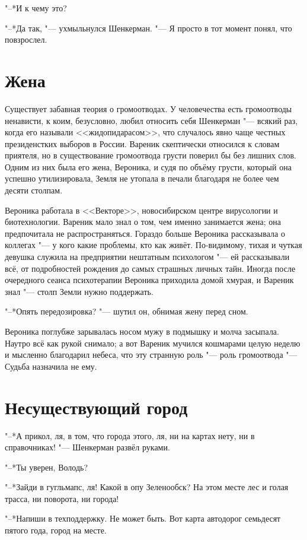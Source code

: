 "--*И к чему это?

"--*Да так, "--- ухмыльнулся Шенкерман.
"--- Я просто в тот момент понял, что повзрослел.

\section{Жена}

Существует забавная теория о громоотводах.
У человечества есть громоотводы ненависти, к коим, безусловно, любил относить себя Шенкерман "--- всякий раз, когда его называли <<жидопидарасом>>, что случалось явно чаще честных президенстких выборов в России.
Вареник скептически относился к словам приятеля, но в существование громоотвода грусти поверил бы без лишних слов.
Одним из них была его жена, Вероника, и судя по объёму грусти, который она успешно утилизировала, Земля не утопала в печали благодаря не более чем десяти столпам.

Вероника работала в <<Векторе>>, новосибирском центре вирусологии и биотехнологии.
Вареник мало знал о том, чем именно занимается жена;
она предпочитала не распространяться.
Гораздо больше Вероника рассказывала о коллегах "--- у кого какие проблемы, кто как живёт.
По-видимому, тихая и чуткая девушка служила на предприятии нештатным психологом "--- ей рассказывали всё, от подробностей рождения до самых страшных личных тайн.
Иногда после очередного сеанса психотерапии Вероника приходила домой хмурая, и Вареник знал "--- столп Земли нужно поддержать.

"--*Опять передозировка? "--- шутил он, обнимая жену перед сном.

Вероника поглубже зарывалась носом мужу в подмышку и молча засыпала.
Наутро всё как рукой снимало;
а вот Вареник мучился кошмарами целую неделю и мысленно благодарил небеса, что эту странную роль "--- роль громоотвода "--- Судьба назначила не ему.

\section{Несуществующий город}

"--*А прикол, ля, в том, что города этого, ля, ни на картах нету, ни в справочниках! "--- Шенкерман развёл руками.

"--*Ты уверен, Володь?

"--*Зайди в гугльмапс, ля!
Какой в опу Зеленообск?
На этом месте лес и голая трасса, ни поворота, ни города!

"--*Напиши в техподдержку.
Не может быть.
Вот карта автодорог семьдесят пятого года, город на месте.


